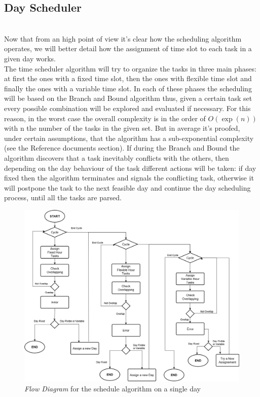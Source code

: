   

\subsection{Day Scheduler}
\\Now that from an high point of view it's clear how the scheduling algorithm operates, we will better detail how the assignment of time slot to each task in a given day works.
\\The time scheduler algorithm will try to organize the tasks in three main phases: at first the ones with a fixed time slot, then the ones with flexible time slot and finally the ones with a variable time slot.
In each of these phases the scheduling will be based on the Branch and Bound algorithm thus, given a certain task set every possible combination will be explored and evaluated if necessary. For this reason, in the worst case the overall complexity is in the order of $O(\exp(n))$ with n the number of the tasks in the given set. But in average it's proofed, under certain assumptions, that the algorithm has a sub-exponential complexity (see the Reference documents section). 
If during the Branch and Bound the algorithm discovers that a task inevitably conflicts with the others, then depending on the day behaviour of the task different actions will be taken: if day fixed then the algorithm terminates and signals the conflicting task, otherwise it will postpone the task to the next feasible day and continue the day scheduling process, until all the tasks are parsed.


\begin{figure}[H]
    \centering
    \includegraphics[scale=0.36]{Pictures/FlowDiagram/Algorithm.png}
    \caption{\emph{Flow Diagram} for the schedule algorithm on a single day}
    \label{fig:singleDayAlg}
\end{figure}

